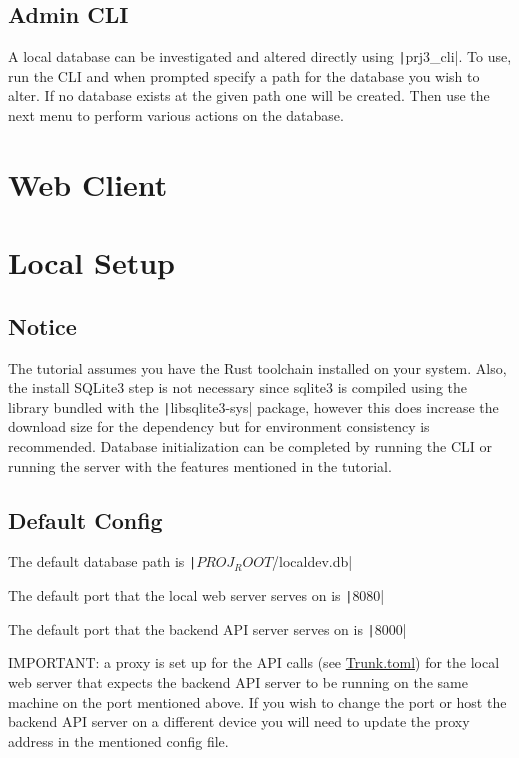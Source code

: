 \documentclass{article}
\begin{document}
\pagebreak

\subsection{Admin CLI}

A local database can be investigated and altered directly using \texttt|prj3_cli|.
To use, run the CLI and when prompted specify a path for the database you wish to alter.
If no database exists at the given path one will be created.  Then use the next menu to perform various actions on the database.

\section{Web Client}

\section{Local Setup}

\subsection{Notice}
The tutorial assumes you have the Rust toolchain installed on your system.
Also, the install SQLite3 step is not necessary since sqlite3 is compiled using the library bundled with the \texttt|libsqlite3-sys| package,
however this does increase the download size for the dependency but for environment consistency is recommended.
Database initialization can be completed by running the CLI or running the server with the features mentioned in the tutorial.

\subsection{Default Config}

The default database path is \texttt|$PROJ_ROOT$/localdev.db|

The default port that the local web server serves on is \texttt|8080|

The default port that the backend API server serves on is \texttt|8000|

IMPORTANT: a proxy is set up for the API calls (see \href{run: ../Trunk.toml}{Trunk.toml}) for the local web server that expects the backend API server to be running on the same machine on the port mentioned above.
If you wish to change the port or host the backend API server on a different device you will need to update the proxy address in the mentioned config file.
\end{document}
